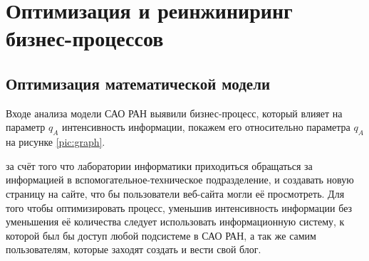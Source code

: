 \section{Оптимизация и реинжиниринг бизнес-процессов}
\subsection{Оптимизация математической модели}
Входе анализа модели САО РАН выявили бизнес-процесс, который влияет на параметр $q_A$ интенсивность информации, покажем его относительно параметра $q_A$ на рисунке \ref{pic:graph}.


за счёт того что лаборатории информатики приходиться обращаться за информацией в вспомогательное-техническое подразделение, и создавать новую страницу на сайте, что бы пользователи веб-сайта могли её просмотреть.   Для того чтобы оптимизировать процесс, уменьшив интенсивность информации без уменьшения её количества следует использовать информационную систему, к которой был бы доступ любой подсистеме в САО РАН, а так же самим пользователям, которые заходят создать и вести свой блог.
\pagebreak